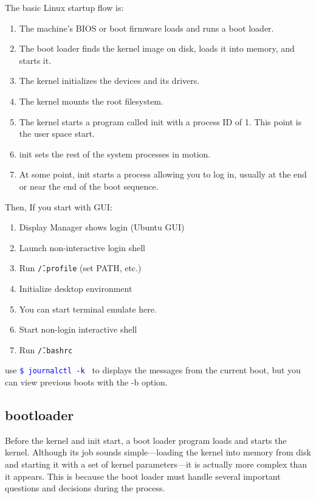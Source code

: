\documentclass[paper=8.5in:11in, twoside, 12pt, pagesize=pdftex]{book}
\newcommand{\linuxcommand}[1]{\texttt{\textcolor{blue}{\$ #1 \Pisymbol{psy}{191}}}}
\begin{document}
 The basic Linux startup flow is:
 \begin{enumerate}
 \item The machine’s BIOS or boot firmware loads and runs a boot loader.
 
 \item The boot loader finds the kernel image on disk, loads it into memory, and starts it.
 
 \item The kernel initializes the devices and its drivers.
 
 \item The kernel mounts the root filesystem.
 
 \item The kernel starts a program called init with a process ID of 1. This point is the user space start.
 
 \item init sets the rest of the system processes in motion.
 
 \item At some point, init starts a process allowing you to log in, usually at the end or near the end of the boot sequence.
 \end{enumerate}
 
 \par Then, If you start with GUI:
 \begin{enumerate}
     \item Display Manager shows login (Ubuntu GUI)
     \item Launch non-interactive login shell
     \item Run \texttt{\~/.profile} (set PATH, etc.)
     \item Initialize desktop environment
     \item You can start terminal emulate here.
     \item Start non-login interactive shell
     \item Run \texttt{\~/.bashrc}
 \end{enumerate}
 
 
	\par use \linuxcommand{journalctl -k} to displays the messages from the current boot, but you can view previous boots with the -b option.
 
\subsection{bootloader}

	Before the kernel and init start, a boot loader program loads and starts the kernel. Although its job sounds simple—loading the kernel into memory from disk and starting it with a set of kernel parameters—it is actually more complex than it appears. This is because the boot loader must handle several important questions and decisions during the process.
\end{document}
